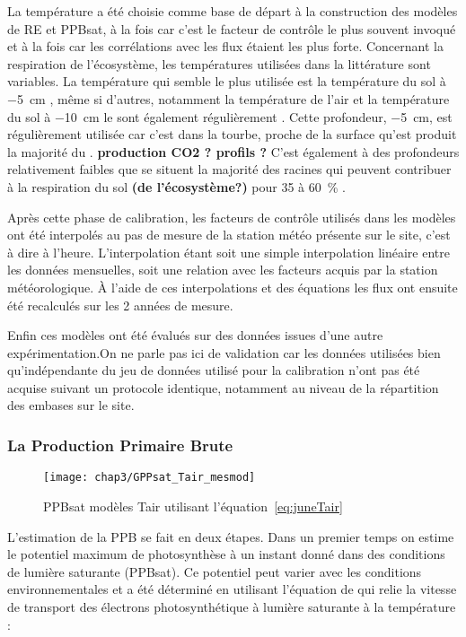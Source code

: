 La température a été choisie comme base de départ à la construction des modèles de RE et PPBsat, à la fois car c'est le facteur de contrôle le plus souvent invoqué et à la fois car les corrélations avec les flux étaient les plus forte.
Concernant la respiration de l'écosystème, les températures utilisées dans la littérature sont variables.
La température qui semble le plus utilisée est la température du sol à \SI{-5}{\centi\metre}  \cite{ballantyne2014}\plop, même si d'autres, notamment la température de l'air et la température du sol à \SI{-10}{\centi\metre} le sont également régulièrement \cite{bortoluzzi2006,kim1992}.
Cette profondeur, \SI{-5}{\cm}, est régulièrement utilisée car c'est dans la tourbe, proche de la surface qu'est produit la majorité du \coo.
\textbf{production CO2 ? profils ?}
C'est également à des profondeurs relativement faibles que se situent la majorité des racines \plop qui peuvent contribuer à la respiration du sol \textbf{(de l'écosystème?)} pour 35 à \SI{60}{\percent} \cite{silvola1996,crow2005}.

Après cette phase de calibration, les facteurs de contrôle utilisés dans les modèles ont été interpolés au pas de mesure de la station météo présente sur le site, c'est à dire à l'heure.
L'interpolation étant soit une simple interpolation linéaire entre les données mensuelles, soit une relation avec les facteurs acquis par la station météorologique.
À l'aide de ces interpolations et des équations les flux ont ensuite été recalculés sur les 2 années de mesure.

Enfin ces modèles ont été évalués sur des données issues d'une autre expérimentation.On ne parle pas ici de validation car les données utilisées bien qu'indépendante du jeu de données utilisé pour la calibration n'ont pas été acquise suivant un protocole identique, notamment au niveau de la répartition des embases sur le site.


\subsubsection{La Production Primaire Brute}

\begin{figure}
\centering
\texttt{[image: chap3/GPPsat\_Tair\_mesmod]}
\caption{PPBsat modèles Tair utilisant l'équation~\ref{eq:juneTair}}
\label{fig:PPBsat_Tair_mdl}
\end{figure}

L'estimation de la PPB se fait en deux étapes.
Dans un premier temps on estime le potentiel maximum de photosynthèse à un instant donné dans des conditions de lumière saturante (PPBsat).
Ce potentiel peut varier avec les conditions environnementales et a été déterminé en utilisant l'équation de \cite{june2004} qui relie la vitesse de transport des électrons photosynthétique à lumière saturante à la température :

